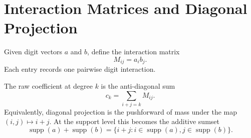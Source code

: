 \section{Interaction Matrices and Diagonal Projection}

Given digit vectors $a$ and $b$, define the interaction matrix
\[
  M_{ij} = a_i b_j.
\]
Each entry records one pairwise digit interaction.

The raw coefficient at degree $k$ is the anti-diagonal sum
\[
  c_k = \sum_{i+j=k} M_{ij}.
\]
Equivalently, diagonal projection is the pushforward of mass under the map
$(i,j)\mapsto i+j$. At the support level this becomes the additive sumset
\[
  \operatorname{supp}(a) + \operatorname{supp}(b)
  = \{i+j : i \in \operatorname{supp}(a), j \in \operatorname{supp}(b)\}.
\]
